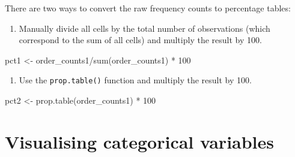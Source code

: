 \documentclass[
  11pt,
  letterpaper,
  DIV=11,
  numbers=noendperiod]{scrreprt}
\newenvironment{Shaded}{\begin{snugshade}}{\end{snugshade}}
\newcommand{\DecValTok}[1]{\textcolor[rgb]{0.68,0.00,0.00}{#1}}
\newcommand{\FunctionTok}[1]{\textcolor[rgb]{0.28,0.35,0.67}{#1}}
\newcommand{\NormalTok}[1]{\textcolor[rgb]{0.00,0.23,0.31}{#1}}
\newcommand{\OtherTok}[1]{\textcolor[rgb]{0.00,0.23,0.31}{#1}}
\newcommand{\SpecialCharTok}[1]{\textcolor[rgb]{0.37,0.37,0.37}{#1}}
\providecommand{\tightlist}{%
  \setlength{\itemsep}{0pt}\setlength{\parskip}{0pt}}\usepackage{longtable,booktabs,array}
\begin{document}
\begin{tcolorbox}[enhanced jigsaw, toprule=.15mm, opacitybacktitle=0.6, coltitle=black, arc=.35mm, colback=white, title=\textcolor{quarto-callout-note-color}{\faInfo}\hspace{0.5em}{How do I obtain percentages?}, titlerule=0mm, toptitle=1mm, bottomtitle=1mm, breakable, rightrule=.15mm, opacityback=0, bottomrule=.15mm, leftrule=.75mm, colframe=quarto-callout-note-color-frame, left=2mm, colbacktitle=quarto-callout-note-color!10!white]

There are two ways to convert the raw frequency counts to percentage
tables:

\begin{enumerate}
\def\labelenumi{\arabic{enumi}.}
\tightlist
\item
  Manually divide all cells by the total number of observations (which
  correspond to the sum of all cells) and multiply the result by 100.
\end{enumerate}

\begin{Shaded}
\begin{Highlighting}[]
\NormalTok{pct1 }\OtherTok{\textless{}{-}}\NormalTok{ order\_counts1}\SpecialCharTok{/}\FunctionTok{sum}\NormalTok{(order\_counts1) }\SpecialCharTok{*} \DecValTok{100}
\end{Highlighting}
\end{Shaded}

\begin{enumerate}
\def\labelenumi{\arabic{enumi}.}
\setcounter{enumi}{1}
\tightlist
\item
  Use the \texttt{prop.table()} function and multiply the result by 100.
\end{enumerate}

\begin{Shaded}
\begin{Highlighting}[]
\NormalTok{pct2 }\OtherTok{\textless{}{-}} \FunctionTok{prop.table}\NormalTok{(order\_counts1) }\SpecialCharTok{*} \DecValTok{100}
\end{Highlighting}
\end{Shaded}

\end{tcolorbox}

\section{Visualising categorical
variables}\label{visualising-categorical-variables}
\end{document}
